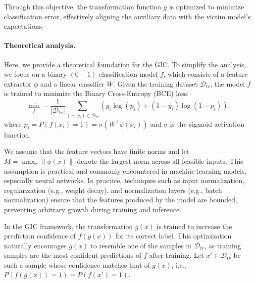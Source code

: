 Through this objective, the transformation function $g$ is optimized to minimize classification error, effectively aligning the auxiliary data with the victim model's expectations.




\paragraph{Theoretical analysis.}
Here, we provide a theoretical foundation for the GIC. To simplify the analysis, we focus on a binary $(0-1)$ classification model $f$, which consists of a feature extractor $\phi$ and a linear classifier $W$. Given the training dataset $\mathcal{D}_{tr}$, the model $f$ is trained to minimize the Binary Cross-Entropy (BCE) loss:  
\begin{equation}
    \label{bce1}
    \min_{f} -\frac{1}{|\mathcal{D}_{tr}|} \sum_{(x_i, y_i) \in \mathcal{D}_{tr}} \left( y_i \log(p_i) + (1 - y_i) \log(1 - p_i) \right),
\end{equation}  
where $p_i = P(f(x_i) = 1) = \sigma(W^\top \phi(x_i))$ and $\sigma$ is the sigmoid activation function.  

We assume that the feature vectors have finite norms and let \( M =\max_{x} \|\phi(x)\|\) denote the largest norm across all feasible inputs. This assumption is practical and commonly encountered in machine learning models, especially neural networks. In practice, techniques such as input normalization, regularization (e.g., weight decay), and normalization layers (e.g., batch normalization) ensure that the features produced by the model are bounded, preventing arbitrary growth during training and inference.

In the GIC framework, the transformation $g(x)$ is trained to increase the prediction confidence of $f(g(x))$ for its correct label. This optimization naturally encourages $g(x)$ to resemble one of the samples in $\mathcal{D}_{tr}$, as training samples are the most confident predictions of $f$ after training. Let $x' \in \mathcal{D}_{tr}$ be such a sample whose confidence matches that of $g(x)$, i.e., $P(f(g(x)) = 1) = P(f(x') = 1)$.  

